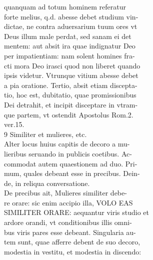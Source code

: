 \documentclass{article}
\begin{document}
\begin{pages}
{                }quanquam ad totum hominem referatur \\
                forte melius, q.d. abesse debet studium vin- \\
                dictae, ne contra aduersarium tuum ores vt \\
                Deus illum male perdat, sed sanam ei det \\
                mentem: aut absit ira quae indignatur Deo \\
                per impatientiam: nam solent homines fra- \\
                cti mora Deo irasci quod non liberet quando \\
                ipsis videtur. Vtrunque vitium abesse debet \\
                a pia oratione. Tertio, absit etiam discepta- \\
                tio, hoc est, dubitatio, quae promissionibus \\
                Dei detrahit, et incipit disceptare in vtram- \\
                que partem, vt ostendit Apostolus Rom.2. \\
                ver.15. \\
                9 Similiter et mulieres, etc. \\
                Alter locus huius capitis de decoro a mu- \\
                lieribus seruando in publicis coetibus. Ac- \\
                commodat autem quaestionem ad duo. Pri- \\
                mum, quales debeant esse in precibus. Dein- \\
                de, in reliqua conversatione. \\
                De precibus ait, Mulieres similiter debe- \\
                re orare: sic enim accipio illa, VOLO EAS \\
                SIMILITER ORARE: aequantur viris studio et \\
                ardore orandi, vt conditionibus illis omni- \\
                bus viris pares esse debeant. Singularia au- \\
                tem sunt, quae afferre debent de suo decoro, \\
                modestia in vestitu, et modestia in discendo: \\

\end{pages}
\end{document}
